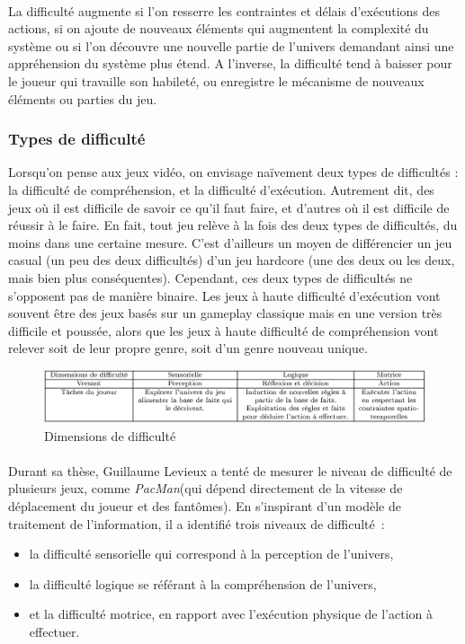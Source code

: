 \paragraph{}La difficulté augmente si l’on resserre les contraintes et délais d’exécutions des actions, si on ajoute de nouveaux éléments qui augmentent la complexité du système ou si l’on découvre une nouvelle partie de l’univers demandant ainsi une appréhension du système plus étend. A l’inverse, la difficulté tend à baisser pour le joueur qui travaille son habileté, ou enregistre le mécanisme de nouveaux éléments ou parties du jeu.

		\subsubsection{Types de difficulté}
Lorsqu'on pense aux jeux vidéo, on envisage naïvement deux types de difficultés : la difficulté de compréhension, et la difficulté d’exécution. Autrement dit, des jeux où il est difficile de savoir ce qu’il faut faire, et d’autres où il est difficile de réussir à le faire. En fait, tout jeu relève à la fois des deux types de difficultés, du moins dans une certaine mesure. C’est d’ailleurs un moyen de différencier un jeu \gls{casual} (un peu des deux difficultés) d’un jeu \gls{hardcore} (une des deux ou les deux, mais bien plus conséquentes). Cependant, ces deux types de difficultés ne s’opposent pas de manière binaire. Les jeux à haute difficulté d’exécution vont souvent être des jeux basés sur un gameplay classique mais en une version très difficile et poussée, alors que les jeux à haute difficulté de compréhension vont relever soit de leur propre genre, soit d’un genre nouveau unique.

\begin{figure}[!hbtp]
	\centering
	\includegraphics[width=\linewidth]{images/dimensions_difficulte.png}
	\caption{Dimensions de difficulté}
	\label{dimensions_difficulte}
\end{figure}

\paragraph{}
Durant sa thèse, Guillaume Levieux\cite{Levi11} a tenté de mesurer le niveau de difficulté de plusieurs jeux, comme \emph{PacMan}(qui dépend directement de la vitesse de déplacement du joueur et des fantômes). En s’inspirant d’un modèle de traitement de l’information, il a identifié trois niveaux de difficulté~:
	\begin{itemize}
		\item la difficulté sensorielle qui correspond à la perception de l’univers,
		\item la difficulté logique se référant à la compréhension de l’univers,
		\item et la difficulté motrice, en rapport avec l'exécution physique de l’action à effectuer.
\end{itemize}

